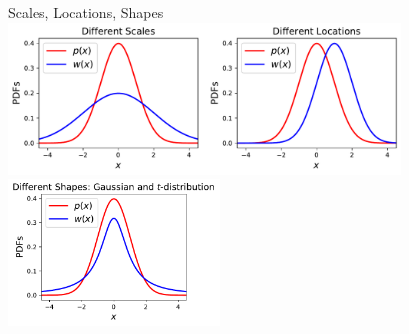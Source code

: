 \begin{frame}{Scales, Locations, Shapes}
\centering
	\includegraphics[width=0.78\textwidth]{../../figs/2GaussianPDFs2Scales2Locations.pdf}
	\includegraphics[width=0.42\textwidth]{../../figs/diff_shapes_Gauss_t.pdf}
\end{frame}

